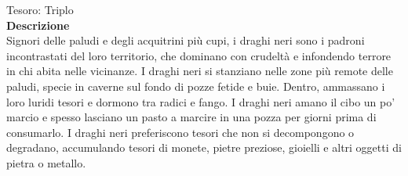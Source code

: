 \begin{multicols}{2}
Tesoro: Triplo\\
\textbf{Descrizione}\\
Signori delle paludi e degli acquitrini più cupi, i draghi neri sono i padroni incontrastati del loro territorio, che dominano con crudeltà e infondendo terrore in chi abita nelle vicinanze. I draghi neri si stanziano nelle zone più remote delle paludi, specie in caverne sul fondo di pozze fetide e buie. Dentro, ammassano i loro luridi tesori e dormono tra radici e fango. I draghi neri amano il cibo un po’ marcio e spesso lasciano un pasto a marcire in una pozza per giorni prima di consumarlo. I draghi neri preferiscono tesori che non si decompongono o degradano, accumulando tesori di monete, pietre preziose, gioielli e altri oggetti di pietra o metallo.\\


\end{multicols}
